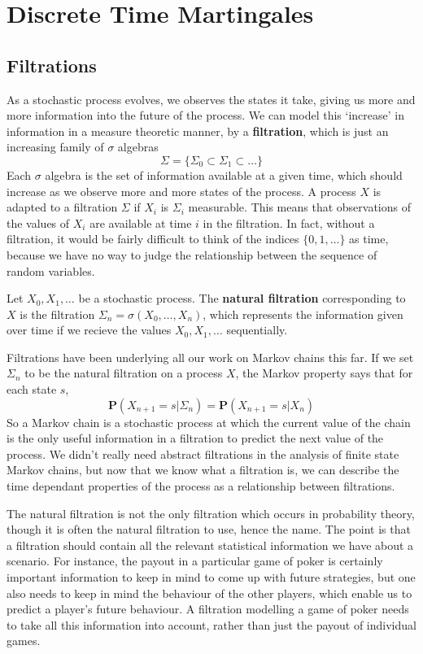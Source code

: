 \chapter{Discrete Time Martingales}

\section{Filtrations}

As a stochastic process evolves, we observes the states it take, giving us more and more information into the future of the process. We can model this `increase' in information in a measure theoretic manner, by a {\bf filtration}, which is just an increasing family of $\sigma$ algebras
%
\[ \Sigma = \{ \Sigma_0 \subset \Sigma_1 \subset \dots \} \]
%
Each $\sigma$ algebra is the set of information available at a given time, which should increase as we observe more and more states of the process. A process $X$ is adapted to a filtration $\Sigma$ if $X_i$ is $\Sigma_i$ measurable. This means that observations of the values of $X_i$ are available at time $i$ in the filtration. In fact, without a filtration, it would be fairly difficult to think of the indices $\{ 0, 1, \dots \}$ as time, because we have no way to judge the relationship between the sequence of random variables.

\begin{example}
    Let $X_0, X_1, \dots$ be a stochastic process. The {\bf natural filtration} corresponding to $X$ is the filtration $\Sigma_n = \sigma(X_0, \dots, X_n)$, which represents the information given over time if we recieve the values $X_0, X_1, \dots$ sequentially.
\end{example}

Filtrations have been underlying all our work on Markov chains this far. If we set $\Sigma_n$ to be the natural filtration on a process $X$, the Markov property says that for each state $s$,
%
\[ \mathbf{P}(X_{n+1} = s | \Sigma_n) = \mathbf{P}(X_{n+1} = s | X_n) \]
%
So a Markov chain is a stochastic process at which the current value of the chain is the only useful information in a filtration to predict the next value of the process. We didn't really need abstract filtrations in the analysis of finite state Markov chains, but now that we know what a filtration is, we can describe the time dependant properties of the process as a relationship between filtrations.

The natural filtration is not the only filtration which occurs in probability theory, though it is often the natural filtration to use, hence the name. The point is that a filtration should contain all the relevant statistical information we have about a scenario. For instance, the payout in a particular game of poker is certainly important information to keep in mind to come up with future strategies, but one also needs to keep in mind the behaviour of the other players, which enable us to predict a player's future behaviour. A filtration modelling a game of poker needs to take all this information into account, rather than just the payout of individual games.

